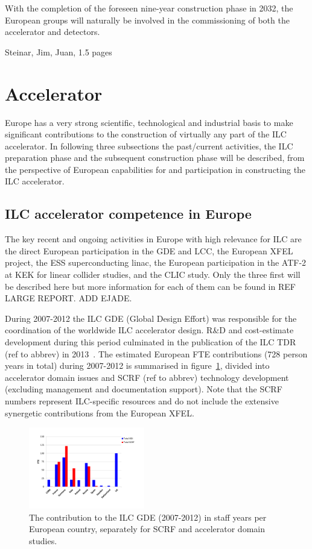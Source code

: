 \documentclass[%
 reprint,
 amsmath,amssymb,
 aps,
]{revtex4-1}
\begin{document}
With the completion of the foreseen nine-year construction phase in 2032, the European groups will naturally
be involved in the commissioning of both the accelerator and detectors.

Steinar, Jim, Juan, 1.5 pages

\section{\label{sec:acc}Accelerator}

Europe has a very strong scientific, technological and industrial basis
to make significant contributions to the construction of virtually any part of the ILC accelerator. 
In following three subsections the past/current activities, the ILC preparation phase and the subsequent construction phase will be described, from the perspective of European capabilities for and participation in constructing the ILC accelerator.   

\subsection{ILC accelerator competence in Europe~\label{sec:competence:accelerator}}

The key recent and ongoing activities in Europe with high relevance for ILC are the direct 
European participation in the GDE and LCC,
the European XFEL project, the ESS superconducting linac, the European participation
in the ATF-2 at KEK for linear collider studies, and the CLIC study. Only the three first will be described here but more information for each of them can be found in REF LARGE REPORT. ADD EJADE.
\vspace{0.15cm}

During 2007-2012 the ILC GDE (Global Design Effort) was responsible for the coordination of the worldwide ILC accelerator design. R\&D and cost-estimate development during this period culminated in the publication of the ILC TDR (ref to abbrev) in 2013~\cite{Behnke:2013xla}. The estimated European FTE contributions (728 person years in total) during 2007-2012 is summarised in figure~\ref{fig:PrePrep:ilcgde4}, 
divided into accelerator domain issues and SCRF (ref to abbrev) technology development (excluding management and documentation support). Note that the SCRF numbers represent ILC-specific resources and do not include the extensive synergetic contributions from the European XFEL.

\begin{figure}[htbp]
\includegraphics[width=0.45\textwidth]{figures/EU-GDE-FTE-columns-per-country.pdf}
\caption{\label{fig:PrePrep:ilcgde4} The contribution to the ILC GDE  (2007-2012) in staff years per European country, separately for SCRF and accelerator domain studies.}
\end{figure}
\end{document}
